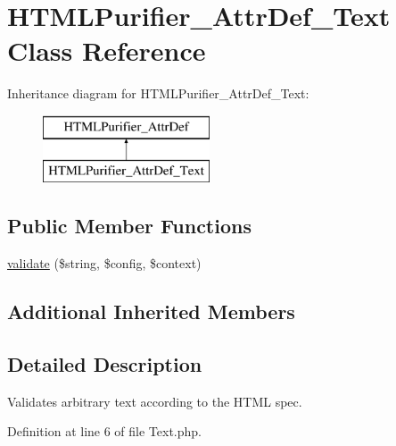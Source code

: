 \hypertarget{classHTMLPurifier__AttrDef__Text}{\section{H\+T\+M\+L\+Purifier\+\_\+\+Attr\+Def\+\_\+\+Text Class Reference}
\label{classHTMLPurifier__AttrDef__Text}
}
Inheritance diagram for H\+T\+M\+L\+Purifier\+\_\+\+Attr\+Def\+\_\+\+Text\+:\begin{figure}[H]
\begin{center}
\leavevmode
\includegraphics[height=2.000000cm]{classHTMLPurifier__AttrDef__Text}
\end{center}
\end{figure}
\subsection*{Public Member Functions}
\begin{DoxyCompactItemize}
\item 
\hyperlink{classHTMLPurifier__AttrDef__Text_a8aaed2fdd47742cbd24bc70f08afece0}{validate} (\$string, \$config, \$context)
\end{DoxyCompactItemize}
\subsection*{Additional Inherited Members}


\subsection{Detailed Description}
Validates arbitrary text according to the H\+T\+M\+L spec. 

Definition at line 6 of file Text.\+php.



